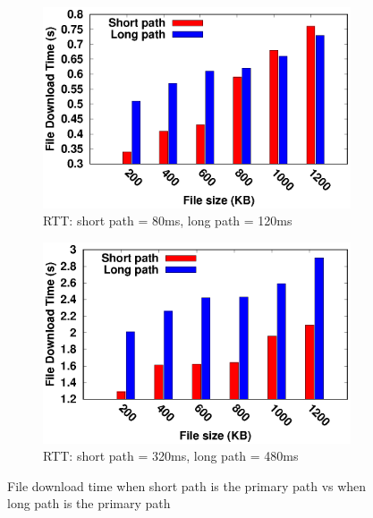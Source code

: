 \begin{figure}[!t]
    \begin{center}
    	\begin{subfigure}{.46\linewidth}
    		\includegraphics[width=0.95\linewidth]{img/exp5/time_needed_5}
    		\caption{\label{fig:timeSentOverPathRTT80}RTT: short path = 80ms, long path = 120ms}
    	\end{subfigure}
		\hspace{0.1cm}
		\begin{subfigure}{.46\linewidth}
			\includegraphics[width=0.95\linewidth]{img/exp5/time_needed_20}
			\caption{\label{fig:timeSentOverPathRTT320}RTT: short path = 320ms, long path = 480ms}
		\end{subfigure}
        
        \caption{\label{fig:timeSentOverPath} File download time when short path is the primary path vs when long path is the primary path}
    \end{center}
\end{figure}

